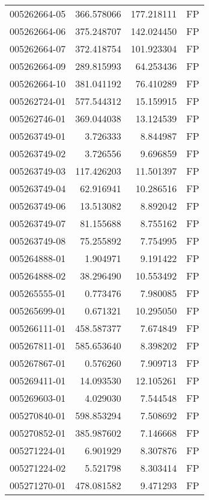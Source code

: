 \begin{tabular}{lrrl}
005262664-05 &  366.578066 &     177.218111 &   FP \\
005262664-06 &  375.248707 &     142.024450 &   FP \\
005262664-07 &  372.418754 &     101.923304 &   FP \\
005262664-09 &  289.815993 &      64.253436 &   FP \\
005262664-10 &  381.041192 &      76.410289 &   FP \\
005262724-01 &  577.544312 &      15.159915 &   FP \\
005262746-01 &  369.044038 &      13.124539 &   FP \\
005263749-01 &    3.726333 &       8.844987 &   FP \\
005263749-02 &    3.726556 &       9.696859 &   FP \\
005263749-03 &  117.426203 &      11.501397 &   FP \\
005263749-04 &   62.916941 &      10.286516 &   FP \\
005263749-06 &   13.513082 &       8.892042 &   FP \\
005263749-07 &   81.155688 &       8.755162 &   FP \\
005263749-08 &   75.255892 &       7.754995 &   FP \\
005264888-01 &    1.904971 &       9.191422 &   FP \\
005264888-02 &   38.296490 &      10.553492 &   FP \\
005265555-01 &    0.773476 &       7.980085 &   FP \\
005265699-01 &    0.671321 &      10.295050 &   FP \\
005266111-01 &  458.587377 &       7.674849 &   FP \\
005267811-01 &  585.653640 &       8.398202 &   FP \\
005267867-01 &    0.576260 &       7.909713 &   FP \\
005269411-01 &   14.093530 &      12.105261 &   FP \\
005269603-01 &    4.029030 &       7.544548 &   FP \\
005270840-01 &  598.853294 &       7.508692 &   FP \\
005270852-01 &  385.987602 &       7.146668 &   FP \\
005271224-01 &    6.901929 &       8.307876 &   FP \\
005271224-02 &    5.521798 &       8.303414 &   FP \\
005271270-01 &  478.081582 &       9.471293 &   FP \\

\end{tabular}
